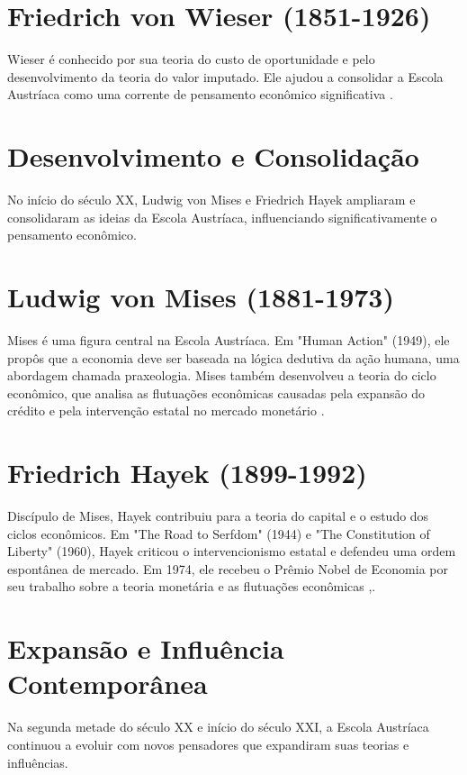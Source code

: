 \section*{Friedrich von Wieser (1851-1926)} 
Wieser é conhecido por sua teoria do custo de oportunidade e pelo desenvolvimento da teoria do valor imputado. Ele ajudou a consolidar a Escola Austríaca como uma corrente de pensamento econômico significativa \cite{bohm1884capital}.

\section*{Desenvolvimento e Consolidação}

No início do século XX, Ludwig von Mises e Friedrich Hayek ampliaram e consolidaram as ideias da Escola Austríaca, influenciando significativamente o pensamento econômico.

\section*{Ludwig von Mises (1881-1973)} 
Mises é uma figura central na Escola Austríaca. Em "Human Action" (1949), ele propôs que a economia deve ser baseada na lógica dedutiva da ação humana, uma abordagem chamada praxeologia. Mises também desenvolveu a teoria do ciclo econômico, que analisa as flutuações econômicas causadas pela expansão do crédito e pela intervenção estatal no mercado monetário \cite{mises1949human}.

\section*{Friedrich Hayek (1899-1992)} 
Discípulo de Mises, Hayek contribuiu para a teoria do capital e o estudo dos ciclos econômicos. Em "The Road to Serfdom" (1944) e "The Constitution of Liberty" (1960), Hayek criticou o intervencionismo estatal e defendeu uma ordem espontânea de mercado. Em 1974, ele recebeu o Prêmio Nobel de Economia por seu trabalho sobre a teoria monetária e as flutuações econômicas \cite{hayek1944road},\cite{hayek1960constitution}.

\section*{Expansão e Influência Contemporânea}

Na segunda metade do século XX e início do século XXI, a Escola Austríaca continuou a evoluir com novos pensadores que expandiram suas teorias e influências.

